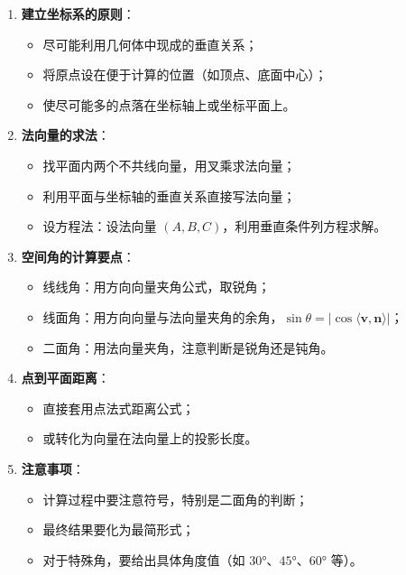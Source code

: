 \documentclass[11pt]{ctexrep}
\begin{document}
\begin{enumerate}
    \item \textbf{建立坐标系的原则}：
    \begin{itemize}
        \item 尽可能利用几何体中现成的垂直关系；
        \item 将原点设在便于计算的位置（如顶点、底面中心）；
        \item 使尽可能多的点落在坐标轴上或坐标平面上。
    \end{itemize}
    
    \item \textbf{法向量的求法}：
    \begin{itemize}
        \item 找平面内两个不共线向量，用叉乘求法向量；
        \item 利用平面与坐标轴的垂直关系直接写法向量；
        \item 设方程法：设法向量 $(A, B, C)$，利用垂直条件列方程求解。
    \end{itemize}
    
    \item \textbf{空间角的计算要点}：
    \begin{itemize}
        \item 线线角：用方向向量夹角公式，取锐角；
        \item 线面角：用方向向量与法向量夹角的余角，$\sin\theta = |\cos\langle\boldsymbol{v}, \boldsymbol{n}\rangle|$；
        \item 二面角：用法向量夹角，注意判断是锐角还是钝角。
    \end{itemize}
    
    \item \textbf{点到平面距离}：
    \begin{itemize}
        \item 直接套用点法式距离公式；
        \item 或转化为向量在法向量上的投影长度。
    \end{itemize}
    
    \item \textbf{注意事项}：
    \begin{itemize}
        \item 计算过程中要注意符号，特别是二面角的判断；
        \item 最终结果要化为最简形式；
        \item 对于特殊角，要给出具体角度值（如 $30°$、$45°$、$60°$ 等）。
    \end{itemize}
\end{enumerate}
\end{document}
